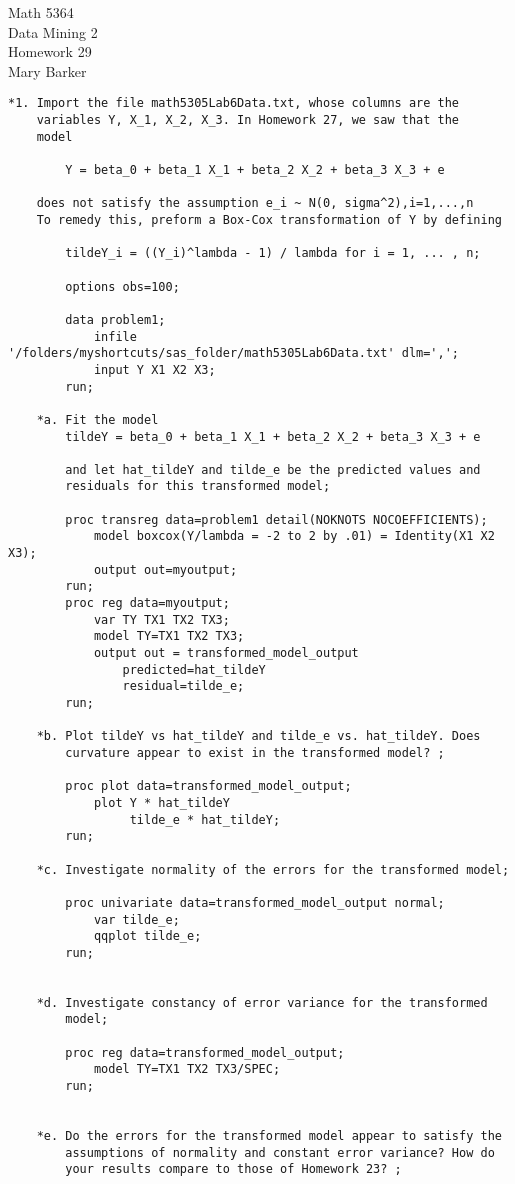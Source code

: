 \documentclass[11pt]{article}
\begin{document}
\noindent\large{Math 5364}\\
\large{Data Mining 2}\\
\large{Homework 29}\\
\large{Mary Barker}

\begin{Verbatim}
*1. Import the file math5305Lab6Data.txt, whose columns are the 
	variables Y, X_1, X_2, X_3. In Homework 27, we saw that the 
	model 
	
		Y = beta_0 + beta_1 X_1 + beta_2 X_2 + beta_3 X_3 + e

	does not satisfy the assumption e_i ~ N(0, sigma^2),i=1,...,n
	To remedy this, preform a Box-Cox transformation of Y by defining 

		tildeY_i = ((Y_i)^lambda - 1) / lambda for i = 1, ... , n;

		options obs=100;
		
		data problem1;
		    infile '/folders/myshortcuts/sas_folder/math5305Lab6Data.txt' dlm=',';
		    input Y X1 X2 X3;
		run;

	*a. Fit the model 
		tildeY = beta_0 + beta_1 X_1 + beta_2 X_2 + beta_3 X_3 + e
		
		and let hat_tildeY and tilde_e be the predicted values and 
		residuals for this transformed model;

		proc transreg data=problem1 detail(NOKNOTS NOCOEFFICIENTS);
			model boxcox(Y/lambda = -2 to 2 by .01) = Identity(X1 X2 X3);
			output out=myoutput;
		run;
		proc reg data=myoutput;
			var TY TX1 TX2 TX3;
			model TY=TX1 TX2 TX3;
			output out = transformed_model_output
				predicted=hat_tildeY
				residual=tilde_e;
		run;

	*b. Plot tildeY vs hat_tildeY and tilde_e vs. hat_tildeY. Does 
		curvature appear to exist in the transformed model? ;

		proc plot data=transformed_model_output;
			plot Y * hat_tildeY
				 tilde_e * hat_tildeY;
		run;
		
	*c. Investigate normality of the errors for the transformed model;

		proc univariate data=transformed_model_output normal;
			var tilde_e;
			qqplot tilde_e;
		run;


	*d. Investigate constancy of error variance for the transformed 
		model;

		proc reg data=transformed_model_output;
		    model TY=TX1 TX2 TX3/SPEC;
		run;


	*e. Do the errors for the transformed model appear to satisfy the 
		assumptions of normality and constant error variance? How do 
		your results compare to those of Homework 23? ;




\end{Verbatim}
\end{document}

